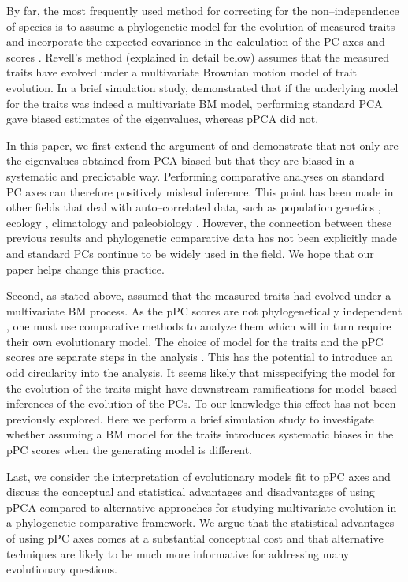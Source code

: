 \documentclass[a4paper,12pt]{article}
\begin{document}
By far, the most frequently used method for correcting for the non--independence of species is to assume a phylogenetic model for the evolution of measured traits and incorporate the expected covariance in the calculation of the PC axes and scores \citep{Revell2008}. Revell's method (explained in detail below) assumes that the measured traits have evolved under a multivariate Brownian motion \citep[BM;][]{Edwards1964} model of trait evolution. In a brief simulation study, \citet{Revell2008} demonstrated that if the underlying model for the traits was indeed a multivariate BM model, performing standard PCA gave biased estimates of the eigenvalues, whereas pPCA did not.

In this paper, we first extend the argument of \citet{Revell2008} and demonstrate that not only are the eigenvalues obtained from PCA biased but that they are biased in a systematic and predictable way. Performing comparative analyses on standard PC axes can therefore positively mislead inference. This point has been made in other fields that deal with auto--correlated data, such as population genetics \citep{Novembre}, ecology \citep{Podani2002}, climatology \citep{Richman1986} and paleobiology \citep{Bookstein2012}. However, the connection between these previous results and phylogenetic comparative data has not been explicitly made and standard PCs continue to be widely used in the field. We hope that our paper helps change this practice.

Second, as stated above, \citet{Revell2008} assumed that the measured traits had evolved under a multivariate BM process. As the pPC scores are not phylogenetically independent \citep[][see below]{Revell2008, Polly2013}, one must use comparative methods to analyze them which will in turn require their own evolutionary model. The choice of model for the traits and the pPC scores are separate steps in the analysis \citep{Revell2008}. 
This has the potential to introduce an odd circularity into the analysis. It seems likely that misspecifying the model for the evolution of the traits might have downstream ramifications for model--based inferences of the evolution of the PCs. To our knowledge this effect has not been previously explored. Here we perform a brief simulation study to investigate whether assuming a BM model for the traits introduces systematic biases in the pPC scores when the generating model is different.  

Last, we consider the interpretation of evolutionary models fit to pPC axes and discuss the conceptual and statistical advantages and disadvantages of using pPCA compared to alternative approaches for studying multivariate evolution in a phylogenetic comparative framework. We argue that the statistical advantages of using pPC axes comes at a substantial conceptual cost and that alternative techniques are likely to be much more informative for addressing many evolutionary questions.
\end{document}
